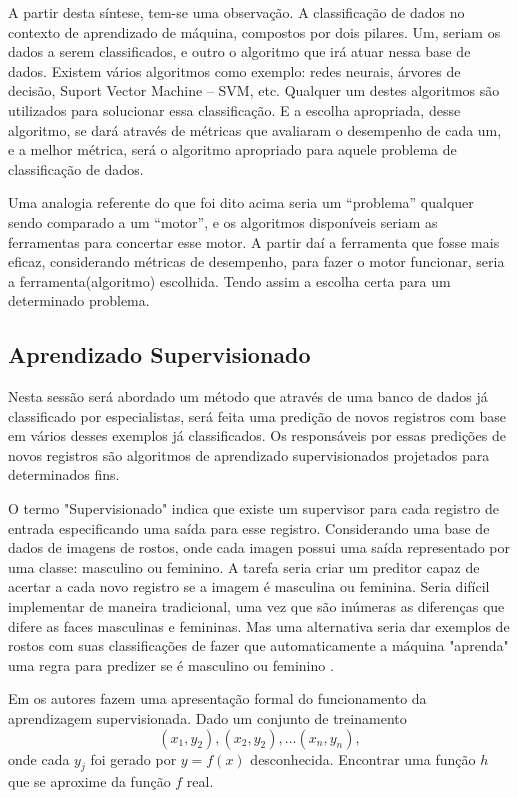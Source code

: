A partir desta síntese, tem-se uma observação. A classificação de dados no contexto de aprendizado de máquina, compostos por dois pilares. Um, seriam os dados a serem classificados, e outro o algoritmo que irá atuar nessa base de dados. Existem vários algoritmos como exemplo: redes neurais, árvores de decisão, Suport Vector Machine – SVM, etc. Qualquer um destes algoritmos são utilizados para solucionar essa classificação. E a escolha apropriada, desse algoritmo, se dará através de métricas que avaliaram o desempenho de cada um, e a melhor métrica, será o algoritmo apropriado para aquele problema de classificação de dados. 

Uma analogia referente do que foi dito acima seria um “problema” qualquer sendo comparado a um “motor”, e os algoritmos disponíveis seriam as ferramentas para concertar esse motor. A partir daí a ferramenta que fosse mais eficaz, considerando métricas de desempenho, para fazer o motor funcionar, seria a ferramenta(algoritmo) escolhida. Tendo assim a escolha certa para um determinado problema.

\subsection{Aprendizado Supervisionado}\label{ssec:aprendSup}

Nesta sessão será abordado um método que através de uma banco de dados já classificado por especialistas, será feita uma predição de novos registros com base em vários desses exemplos já classificados. Os responsáveis por essas predições de novos registros são algoritmos de aprendizado supervisionados projetados para determinados fins.


O termo "Supervisionado" indica que existe um supervisor para cada registro de entrada especificando uma saída para esse registro. Considerando uma base de dados de imagens de rostos, onde cada imagen possui uma saída representado por uma classe: masculino ou feminino. A tarefa seria criar um preditor capaz de acertar a cada novo registro se a imagem é masculina ou feminina. Seria  difícil  implementar de maneira tradicional, uma vez que são inúmeras as diferenças que difere as faces masculinas e femininas. Mas uma alternativa seria dar exemplos de rostos com suas classificações de fazer que automaticamente a máquina "aprenda" uma regra para predizer se é masculino ou feminino \cite{Barber2011}.

Em \cite{RusselStuart.Norvig2013} os autores fazem uma apresentação formal do funcionamento da aprendizagem supervisionada. Dado um conjunto de treinamento 
\begin{equation}
 (x_{1},y_{2}),(x_{2},y_{2}),...(x_{n},y_{n}),
 \label{eq:aprendSup}
\end{equation}
onde cada ${y_{j}} $ foi gerado por ${y=f(x)}$ desconhecida. Encontrar uma função ${h}$ que se aproxime da função ${f}$ real.

